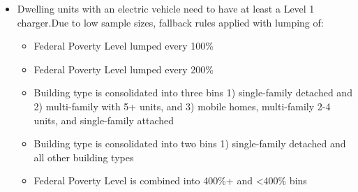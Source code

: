 \begin{itemize}
\item Dwelling units with an electric vehicle need to have at least a Level 1 charger.Due to low sample sizes, fallback rules applied with lumping of:
  \begin{itemize}
  \item Federal Poverty Level lumped every 100\%
  \item Federal Poverty Level lumped every 200\%
  \item Building type is consolidated into three bins 1) single-family detached and 2) multi-family with 5+ units, and 3) mobile homes, multi-family 2-4 units, and single-family attached
  \item Building type is consolidated into two bins 1) single-family detached and all other building types
  \item Federal Poverty Level is combined into 400\%+ and <400\% bins
  \end{itemize}
\end{itemize}
